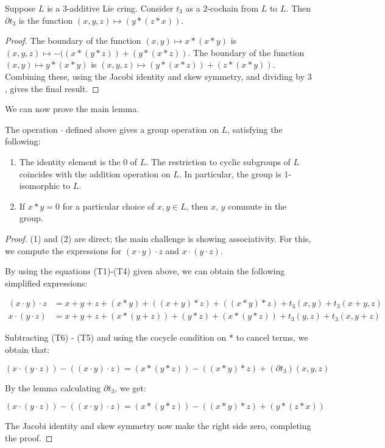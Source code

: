 \documentclass[10pt]{amsart}
\begin{document}
\begin{lemma}
  Suppose $L$ is a $3$-additive Lie cring. Consider $t_3$ as a
  $2$-cochain from $L$ to $L$. Then $\partial t_3$ is the function
  $(x,y,z) \mapsto (y * (z * x))$.
\end{lemma}

\begin{proof}
  The boundary of the function $(x,y) \mapsto x * (x * y)$ is $(x,y,z)
  \mapsto -((x * (y * z)) + (y * (x * z))$. The boundary of the
  function $(x,y) \mapsto y * (x * y)$ is $(x,y,z) \mapsto (y * (x *
  z)) + (z * (x * y))$. Combining these, using the Jacobi identity and
  skew symmetry, and dividing by $3$, gives the final result.
\end{proof}

We can now prove the main lemma.

\begin{lemma}\label{3additiveclass3expoisgroup}
  The operation $\cdot$ defined above gives a group operation on $L$,
  satisfying the following:

  \begin{enumerate}
  \item The identity element is the $0$ of $L$. The restriction to
    cyclic subgroups of $L$ coincides with the addition operation on
    $L$. In particular, the group is $1$-isomorphic to $L$.
  \item If $x * y = 0$ for a particular choice of $x,y \in L$, then
    $x$, $y$ commute in the group.
  \end{enumerate}
\end{lemma}

\begin{proof}
  (1) and (2) are direct; the main challenge is showing
  associativity. For this, we compute the expressions for $(x \cdot y)
  \cdot z$ and $x \cdot (y \cdot z)$.

  By using the equations (T1)-(T4) given above, we can obtain the following simplified expressions:
 
  \begin{align*}
    (x \cdot y) \cdot z & = x + y + z + (x * y) + ((x + y) * z) + ((x * y) * z) + t_3(x,y) + t_3(x + y,z) \tag{T5}\\
    x \cdot (y \cdot z) & = x + y + z + (x * (y + z)) + (y * z) + (x * (y * z)) + t_3(y,z) + t_3(x,y + z) \tag{T6}
  \end{align*}

  Subtracting (T6) - (T5) and using the cocycle condition on $*$ to
  cancel terms, we obtain that:

  $$(x \cdot (y \cdot z)) - ((x \cdot y) \cdot z) = (x * (y * z)) - ((x * y) * z) + (\partial t_3)(x,y,z)$$

  By the lemma calculating $\partial t_3$, we get:

  $$(x \cdot (y \cdot z)) - ((x \cdot y) \cdot z) = (x * (y * z)) - ((x * y) * z) + (y * (z * x))$$

  The Jacobi identity and skew symmetry now make the right side zero,
  completing the proof.
\end{proof}
\end{document}
